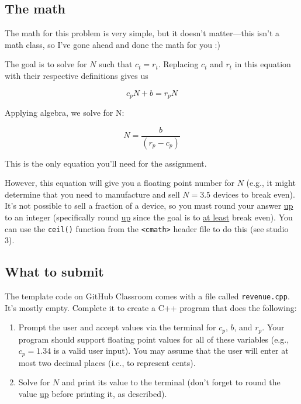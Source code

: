 \documentclass{article}
\begin{document}
\subsection{The math}

The math for this problem is very simple, but it doesn't matter---this isn't a math class, so I've gone ahead and done the math for you :)

The goal is to solve for $N$ such that $c_t = r_t$. Replacing $c_t$ and $r_t$ in this equation with their respective definitions gives us 

\begin{equation}
    c_pN + b = r_pN
\end{equation}

Applying algebra, we solve for N:

\begin{equation}
    \label{eq:solve_n_devices}
    N = \frac{b}{(r_p - c_p)}
\end{equation}

This is the only equation you'll need for the assignment.

However, this equation will give you a floating point number for $N$ (e.g., it might determine that you need to manufacture and sell $N=3.5$ devices to break even). It's not possible to sell a fraction of a device, so you must round your answer \ul{up} to an integer (specifically round \ul{up} since the goal is to \ul{at least} break even). You can use the \texttt{ceil()} function from the \texttt{<cmath>} header file to do this (see studio 3).

\subsection{What to submit}

The template code on GitHub Classroom comes with a file called \texttt{revenue.cpp}. It's mostly empty. Complete it to create a C++ program that does the following:

\begin{enumerate}
    \item Prompt the user and accept values via the terminal for $c_p$, $b$, and $r_p$. Your program should support floating point values for all of these variables (e.g., $c_p = 1.34$ is a valid user input). You may assume that the user will enter at most two decimal places (i.e., to represent cents).
    \item Solve for $N$ and print its value to the terminal (don't forget to round the value \ul{up} before printing it, as described).
\end{enumerate}
\end{document}
